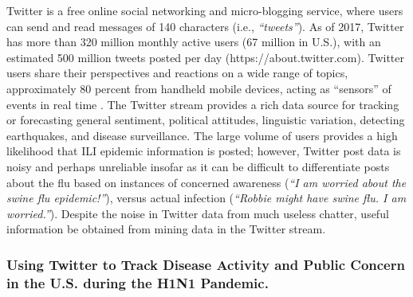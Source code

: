 \documentclass[sigconf]{acmart}
\begin{document}
Twitter is a free online social networking and micro-blogging service, where users can send 
and read messages of 140 characters (i.e., {\it ``tweets''}). As of 2017, Twitter has more 
than 320 million monthly active users (67 million in U.S.), with an estimated 500 million 
tweets posted per day (https://about.twitter.com). Twitter users share their perspectives and
reactions on a wide range of topics, approximately 80 percent from handheld mobile devices, 
acting as ``sensors'' of events in real time \cite{achrekar12}. The Twitter stream provides 
a rich data source for tracking or forecasting general sentiment, political attitudes, 
linguistic variation, detecting earthquakes, and disease surveillance. The large volume of 
users provides a high likelihood that ILI epidemic information is posted; however, Twitter 
post data is noisy and perhaps unreliable insofar as it can be difficult to differentiate 
posts about the flu based on instances of concerned awareness ({\it ``I am worried about 
the swine flu epidemic!''}), versus actual infection ({\it ``Robbie might have swine flu. 
I am worried.''})\cite{lamb13}. Despite the noise in Twitter data from much useless chatter, 
useful information be obtained from mining data in the Twitter stream. 


\subsubsection{Using Twitter to Track Disease Activity and Public Concern in the 
U.S. during the H1N1 Pandemic.}
\end{document}
